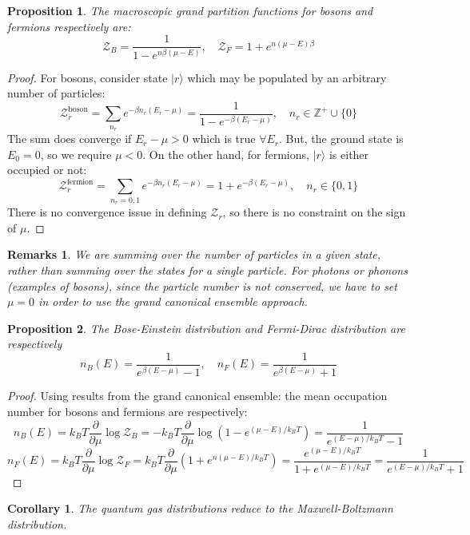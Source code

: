 \documentclass[a4paper]{article}
\newtheorem{remarks}{Remarks}[section]
\theoremstyle{new}
\newtheorem{prop}{Proposition}[section]
\newtheorem{cor}{Corollary}[section]
\begin{document}
\begin{prop}
The macroscopic grand partition functions for bosons and fermions respectively are:
\begin{equation}
\mathcal{Z}_B=\frac{1}{1-e^{n\beta(\mu-E)}},\quad\mathcal{Z}_F=1+e^{n(\mu-E)\beta}\label{bosonsfermions}
\end{equation}
\end{prop}
\begin{proof}
For bosons, consider state $|r\rangle$ which may be populated by an arbitrary number of particles:
$$\mathcal{Z}^{\text{boson}}_r=\sum_{n_r}e^{-\beta n_r(E_r-\mu)}=\frac{1}{1-e^{-\beta(E_r-\mu)}},\quad n_r\in\mathbb{Z}^+\cup\{0\}$$
The sum does converge if $E_r-\mu>0$ which is true $\forall E_r$. But, the ground state is $E_0=0$, so we require $\mu<0$. On the other hand, for fermions, $|r\rangle$ is either occupied or not:
$$\mathcal{Z}^{\text{fermion}}_r=\sum_{n_r=0,1}e^{-\beta n_r(E_r-\mu)}=1+e^{-\beta(E_r-\mu)},\quad n_r\in\{0,1\}$$
There is no convergence issue in defining $\mathcal{Z}_r$, so there is no constraint on the sign of $\mu$.
\end{proof}
\begin{remarks}
We are summing over the number of particles in a given state, rather than summing over the states for a single particle. For photons or phonons (examples of bosons), since the particle number is not conserved, we have to set $\mu=0$ in order to use the grand canonical ensemble approach.
\end{remarks}
\begin{prop}
The Bose-Einstein distribution and Fermi-Dirac distribution are respectively
\begin{equation}
n_B(E)=\frac{1}{e^{\beta(E-\mu)}-1},\quad n_F(E)=\frac{1}{e^{\beta(E-\mu)}+1}\label{bosonsfermions2}
\end{equation}
\end{prop}
\begin{proof}
Using results from the grand canonical ensemble: the mean occupation number for bosons and fermions are respectively:
$$n_B(E)=k_BT\frac{\partial}{\partial\mu}\log \mathcal{Z}_B=-k_BT\frac{\partial}{\partial\mu}\log(1-e^{(\mu-E)/k_BT})=\frac{1}{e^{(E-\mu)/k_BT}-1}$$
$$n_F(E)=k_BT\frac{\partial}{\partial\mu}\log\mathcal{Z}_F=k_BT\frac{\partial}{\partial\mu}(1+e^{n(\mu-E)/k_BT})=\frac{e^{(\mu-E)/k_BT}}{1+e^{(\mu-E)/k_BT}}=\frac{1}{e^{(E-\mu)/k_BT}+1}$$
\end{proof}
\begin{cor}
The quantum gas distributions reduce to the Maxwell-Boltzmann distribution.
\end{cor}
\end{document}
